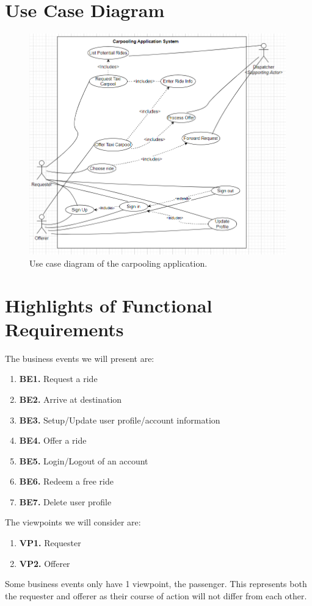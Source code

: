 \documentclass[]{article}
\begin{document}
\newpage\section{Use Case Diagram}
\label{sec:use_case_diagram}
\begin{figure}[h]
	\centering
	\includegraphics[width=30em]{../D1/assets/usecase_v3.png}
	\caption{Use case diagram of the carpooling application.}
	\label{fig:usecase}
\end{figure}

\section{Highlights of Functional Requirements}
\label{sec:functional_requirements}
The business events we will present are:
\begin{enumerate}
    \item[] \textbf{BE1.} Request a ride
    \item[] \textbf{BE2.} Arrive at destination
    \item[] \textbf{BE3.} Setup/Update user profile/account information
    \item[] \textbf{BE4.} Offer a ride
    \item[] \textbf{BE5.} Login/Logout of an account
    \item[] \textbf{BE6.} Redeem a free ride
    \item[] \textbf{BE7.} Delete user profile
\end{enumerate}

The viewpoints we will consider are:
\begin{enumerate}
    \item[] \textbf{VP1.} Requester
    \item[] \textbf{VP2.} Offerer
\end{enumerate}
Some business events only have 1 viewpoint, the passenger. This represents both the requester and offerer as their course of action will not differ from each other.
\end{document}
